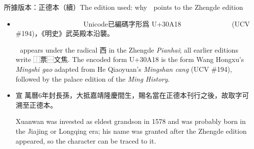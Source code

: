 \documentclass[aspectratio=169,12pt,t]{beamer}
\newcommand{\ctu}[1]{\textcolor{wxtu}{#1}}
\newcommand{\en}[1]{\par{\parskip=0pt\scriptsize\color{black!60}#1\par}}
\begin{document}
\begin{frame}{所據版本：正德本（續）}{The edition used: why 𰨘 points to the Zhengde edition}
  \begin{itemize}
    \item \ctu{𰨘}見於正德本篇海「西部」，正德篇海以前四聲篇海皆作「⿰票⿱文焦」之形。Unicode已編碼字形爲 U+30A18 𰨘：是王鴻緒版《明史稿》據何喬遠《名山藏》字形所改(UCV \#194)，《明史》武英殿本沿襲。
      \en{𰨘 appears under the radical 西 in the Zhengde \emph{Pianhai}; all earlier editions write ⿰票⿱文焦. The encoded form U+30A18 is the form Wang Hongxu's \emph{Mingshi gao} adapted from He Qiaoyuan's \emph{Mingshan cang} (UCV \#194), followed by the palace edition of the \emph{Ming History}.}
    \item 宣𰨘萬曆6年封長孫，大抵嘉靖隆慶間生，賜名當在正德本刊行之後，故取字可溯至正德本。
      \en{Xuanwan was invested as eldest grandson in 1578 and was probably born in the Jiajing or Longqing era; his name was granted after the Zhengde edition appeared, so the character can be traced to it.}
  \end{itemize}
\end{frame}
\end{document}
